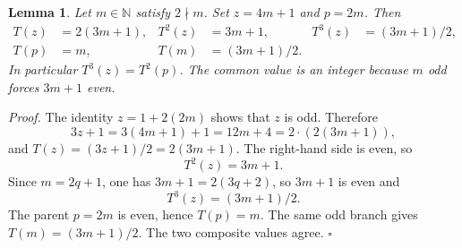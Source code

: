 \documentclass[11pt,letterpaper]{article}
\newcommand{\N}{\mathbb{N}}
\newtheorem{lemma}[theorem]{Lemma}
\newenvironment{proof}{\noindent\textit{Proof.}}{\hfill\(\square\)}
\begin{document}
\begin{lemma}
\label{lem:join}
Let \(m\in\N\) satisfy \(2\nmid m\). Set \(z=4m+1\) and \(p=2m\). Then
\begin{align*}
T(z)&=2(3m+1),&
T^{2}(z)&=3m+1,&
T^{3}(z)&=(3m+1)/2,\\
T(p)&=m,&
T(m)&=(3m+1)/2.
\end{align*}
In particular \(T^{3}(z)=T^{2}(p)\). The common value is an integer because \(m\) odd forces \(3m+1\) even.
\end{lemma}

\begin{proof}
The identity \(z=1+2(2m)\) shows that \(z\) is odd. Therefore
\[
3z+1=3(4m+1)+1=12m+4=2\cdot(2(3m+1)),
\]
and \(T(z)=(3z+1)/2=2(3m+1)\). The right-hand side is even, so
\[
T^{2}(z)=3m+1.
\]
Since \(m=2q+1\), one has \(3m+1=2(3q+2)\), so \(3m+1\) is even and
\[
T^{3}(z)=(3m+1)/2.
\]
The parent \(p=2m\) is even, hence \(T(p)=m\). The same odd branch gives \(T(m)=(3m+1)/2\). The two composite values agree.
\end{proof}
\end{document}
